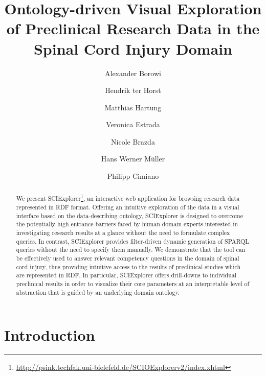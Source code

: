 \documentclass[runningheads,a4paper]{llncs}
\begin{document}
\mainmatter

\title{Ontology-driven Visual Exploration of Preclinical Research Data in the Spinal Cord Injury Domain}
\author{Alexander Borowi \and
Hendrik ter Horst \and
Matthias Hartung \and
Veronica Estrada \and
Nicole Brazda \and
Hans Werner Müller \and
Philipp Cimiano}
\maketitle

\begin{abstract}
We present SCIExplorer\footnote{\url{http://psink.techfak.uni-bielefeld.de/SCIOExplorerv2/index.xhtml}}, an interactive web application for browsing research data represented in RDF format. Offering an intuitive exploration of the data in a visual interface based on the data-describing ontology, SCIExplorer is designed to overcome the potentially high entrance barriers faced by human domain experts interested in investigating research results at a glance without the need to formulate complex queries. In contrast, SCIExplorer provides filter-driven dynamic generation of SPARQL queries without the need to specify them manually. We demonstrate that the tool can be effectively used to answer relevant competency questions in the domain of spinal cord injury, thus providing intuitive access to the results of preclinical studies which are represented in RDF. In particular, SCIExplorer offers drill-downs to individual preclinical results in order to visualize their core parameters at an interpretable level of abstraction that is guided by an underlying domain ontology.

\end{abstract}


\section{Introduction}
\end{document}
